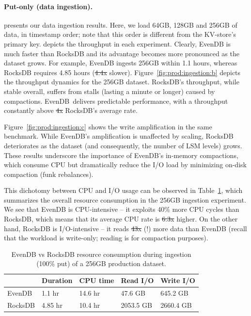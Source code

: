 \documentclass[sigplan,10pt]{acmart}
\newcommand{\sys}{EvenDB}
\providecommand{\DIFadd}[1]{{\protect\color{blue}\uwave{#1}}} %
\providecommand{\DIFdel}[1]{{\protect\color{red}\sout{#1}}}                      %
\providecommand{\DIFaddbegin}{} %
\providecommand{\DIFaddend}{} %
\providecommand{\DIFdelbegin}{} %
\providecommand{\DIFdelend}{} %
\begin{document}
\paragraph{Put-only (data ingestion).} 
 presents our  data ingestion results. 
Here, we load 64GB, 128GB and 256GB of data, in timestamp order; note that this order is different from the KV-store's primary key. 
  depicts the throughput in each experiment. Clearly, \sys\/ is much faster than RocksDB and its advantage 
becomes more pronounced as the dataset grows. For example, \sys\/ ingests 256GB  within 1.1 hours, 
whereas RocksDB requires 4.85 hours (\DIFdelbegin \DIFdel{4.4x }\DIFdelend \DIFaddbegin \DIFadd{$4.4\times$ }\DIFaddend slower). Figure~\ref{fig:prod:ingestion:b} depicts the  
throughput dynamics for the 256GB dataset. RocksDB's throughput, while stable overall, suffers from stalls 
(lasting a minute or longer) caused by compactions. 
\sys\ delivers predictable performance, with a throughput constantly above \DIFdelbegin \DIFdel{4x }\DIFdelend \DIFaddbegin \DIFadd{$4\times$ }\DIFaddend RocksDB's average rate.

Figure~\ref{fig:prod:ingestion:c} shows the write amplification in the same benchmark. 
While \sys's amplification is unaffected by  scaling, RocksDB deteriorates as the dataset (and consequently, the number of LSM levels) grows. 
These results underscore the importance of \sys's in-memory compactions, which consume CPU 
but dramatically reduce the I/O load by minimizing on-disk compaction (funk rebalances). 

This dichotomy between CPU and I/O usage can be observed in 
Table~\ref{fig:io_cpu_bound}, which summarizes  the overall resource consumption in the  256GB ingestion
experiment. We see that \sys\/ is CPU-intensive -- it exploits 40\% more CPU cycles than RocksDB, which means that its average CPU rate is \DIFdelbegin \DIFdel{6.3x }\DIFdelend \DIFaddbegin \DIFadd{$6.3\times$ }\DIFaddend higher. 
On the other hand, RocksDB is I/O-intensive -- it reads \DIFdelbegin \DIFdel{43x }\DIFdelend \DIFaddbegin \DIFadd{$43\times$ }\DIFaddend (!) more data than \sys\/ (recall that the workload is write-only; reading is for compaction purposes). 

\begin{table}[t]
\small
\begin{tabular}{lllll}
& Duration
 &  CPU time  & Read I/O & Write I/O\\
\hline 
\sys &  1.1 hr & 14.6 hr & 	47.6 GB 	&  645.2	GB \\
RocksDB & 4.85 hr & 10.4 hr &  2053.5 GB & 2660.4	GB\\
\end{tabular}
\caption{\sys\/ vs RocksDB resource consumption during ingestion (100\% put) of a 256GB production dataset.}
\label{fig:io_cpu_bound}
\end{table}
\end{document}
